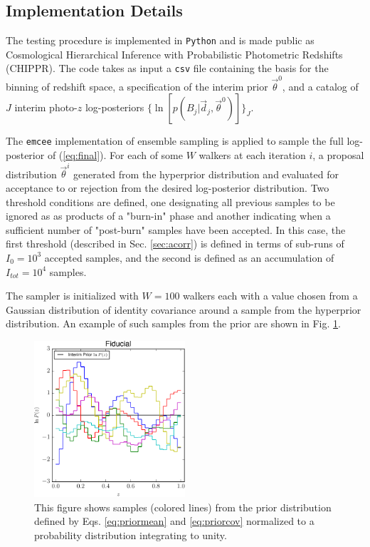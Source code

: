 \documentclass[preprint]{aastex}
\begin{document}
\subsection{Implementation Details}
\label{sec:mcmc}

The testing procedure is implemented in \texttt{Python} and is made public as 
Cosmological Hierarchical Inference with Probabilistic Photometric Redshifts 
(CHIPPR).  The code takes as input a \texttt{csv} file containing the basis for 
the binning of redshift space, a specification of the interim prior 
$\vec{\theta}^{0}$, and a catalog of $J$ interim photo-$z$ log-posteriors 
$\{\ln[p(B_{j}|\vec{d}_{j},\vec{\theta}^{0})]\}_{J}$.

The \texttt{emcee} \citep{Foreman-Mackey2013} implementation of ensemble 
sampling is applied to sample the full log-posterior of (\ref{eq:final}).   For 
each of some $W$ walkers at each iteration $i$, a proposal distribution 
$\vec{\theta}^{i}$ generated from the hyperprior distribution and evaluated for 
acceptance to or rejection from the desired log-posterior distribution.  Two 
threshold conditions are defined, one designating all previous samples to be 
ignored as as products of a "burn-in" phase and another indicating when a 
sufficient number of "post-burn" samples have been accepted.  In this case, the 
first threshold (described in Sec. \ref{sec:acorr}) is defined in terms of 
sub-runs of $I_{0}=10^{3}$ accepted samples, and the second is defined as an 
accumulation of $I_{tot}=10^{4}$ samples.

The sampler is initialized with $W=100$ walkers each with a value chosen from a 
Gaussian distribution of identity covariance around a sample from the 
hyperprior distribution.  An example of such samples from the prior are shown 
in Fig. \ref{fig:prior}.

\begin{figure}
\includegraphics[width=0.5\textwidth]{figs/null/priorsamps.pdf}
\caption{This figure shows samples (colored lines) from the prior distribution 
defined by Eqs. \ref{eq:priormean} and \ref{eq:priorcov} normalized to a 
probability distribution integrating to unity.}
\label{fig:prior}
\end{figure}
\end{document}
